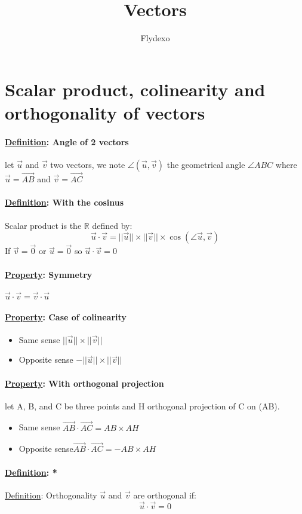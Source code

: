 \documentclass{article}
\title{Vectors}
\author{Flydexo}
\newcommand{\definition}[1]{\paragraph*{\underline{Definition}: #1}}
\renewcommand{\vec}[1]{\overrightarrow{#1}}
\begin{document}
\maketitle
\tableofcontents
\section{Scalar product, colinearity and orthogonality of vectors}
\paragraph*{\underline{Definition}: Angle of 2 vectors}
let $\vec{u}$ and $\vec{v}$ two vectors, we note $\angle(\vec{u},\vec{v})$ the geometrical angle $\angle{ABC}$ where $\vec{u} = \vec{AB}$ and $\vec{v} = \vec{AC}$
\paragraph*{\underline{Definition}: With the cosinus}
Scalar product is the $\mathbb{R}$ defined by:
$$\vec{u}\cdot\vec{v} = ||\vec{u}|| \times ||\vec{v}|| \times \cos{(\angle{\vec{u}, \vec{v}})}$$ If $\vec{v} = \vec{0}$ or $\vec{u} = \vec{0}$ so $\vec{u} \cdot \vec{v} = 0$
\paragraph*{\underline{Property}: Symmetry}
$\vec{u} \cdot \vec{v} = \vec{v} \cdot \vec{u}$
\paragraph*{\underline{Property}: Case of colinearity}
\begin{itemize}
    \item Same sense $||\vec{u}|| \times ||\vec{v}||$
    \item Opposite sense $-||\vec{u}|| \times ||\vec{v}||$
\end{itemize}
\paragraph*{\underline{Property}: With orthogonal projection}
let A, B, and C be three points and H orthogonal projection of C on (AB). \begin{itemize}
    \item Same sense $\vec{AB} \cdot \vec{AC} = AB \times AH$
    \item Opposite sense$\vec{AB} \cdot \vec{AC} = -AB \times AH$
\end{itemize}
\definition*{\underline{Definition}: Orthogonality}
$\vec{u}$ and $\vec{v}$ are orthogonal if: $$\vec{u} \cdot \vec{v} = 0$$
\end{document}
